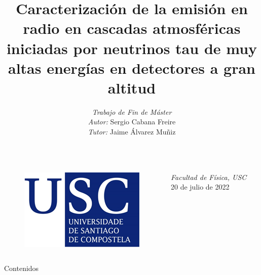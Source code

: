 \documentclass{beamer}
\title[]{Caracterización de la emisión en radio en cascadas atmosféricas iniciadas por
neutrinos tau de muy altas energías en detectores a gran altitud}
\author[USC. Curso 2021/22]{\textit{Trabajo de Fin de Máster}\vspace{5mm}\\\textit{Autor:} Sergio Cabana Freire\vspace{5mm}\\\textit{Tutor:} Jaime Álvarez Muñiz}
\date[Trabajo Fin de Máster]{}
\begin{document}
	\begin{frame}
		\titlepage
		\vspace{-15mm}
		\begin{columns}
		\begin{figure}[H]
		\centering
		\includegraphics[width=.45\linewidth]{figures/USC}
		\end{figure}
		\begin{center}
		\textit{Facultad de Física, USC}
		\vspace{5mm}\\
		20 de julio de 2022
		\end{center}
		\end{columns}
	\end{frame}
	
	\begin{frame}{Contenidos}
		\tableofcontents
	\end{frame}
\end{document}
